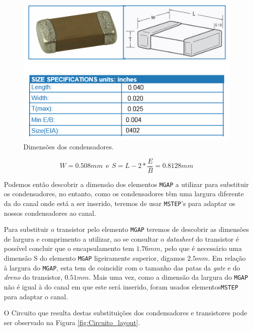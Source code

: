 \documentclass[11pt]{article}
\numberwithin{equation}{section}
\begin{document}
\begin{figure}[H]
	\centering
	\includegraphics[keepaspectratio=true, scale=0.45]{teoricas/capacitor}
	\vspace{-0.5em}
	\caption{Dimensões dos condensadores.}
	\vspace{-0.8em}
	\label{fig:capacitor}
\end{figure}

\begin{equation}
W = 0.508 mm ~~ \text{e} ~~ S = L - 2*\frac{E}{B} = 0.8128 mm
\label{eq:capacitor}
\end{equation}

Podemos então descobrir a dimensão dos elementos \texttt{MGAP} a utilizar para substituir os condensadores, no entanto, como os condensadores têm uma largura diferente da do canal onde está a ser inserido, teremos de usar \texttt{MSTEP}'s para adaptar os nossos condensadores ao canal.

Para substituir o transistor pelo elemento \texttt{MGAP} teremos de descobrir as dimensões de largura e comprimento a utilizar, ao se consultar o \textit{datasheet} do transistor é possível  concluir que o encapsulamento tem $ 1.76 mm $, pelo que é necessário uma dimensão S do elemento \texttt{MGAP} ligeiramente superior, digamos $ 2.5 mm $. Em relação à largura do \texttt{MGAP}, esta tem de coincidir com o tamanho das patas da \textit{gate} e do \textit{dreno} do transistor, $ 0.51 mm $. Mais uma vez, como a dimensão da largura do \texttt{MGAP} não é igual à do canal em que este será inserido, foram usados elementos\texttt{MSTEP} para adaptar o canal.

O Circuito que resulta destas substituições dos condensadores e transistores pode ser observado na Figura \ref{fig:Circuito_layout}.
\end{document}

